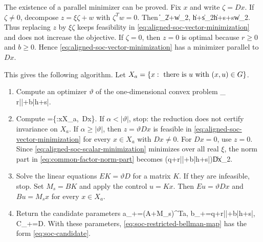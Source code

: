 \documentclass{article}
\begin{document}
The existence of a parallel minimizer can be proved. Fix $x$ and write $\zeta=Dx$. If $\zeta\neq0$, decompose $z=\xi\zeta+w$ with $\zeta^Tw=0$. Then
\BEQ
\|\xi\zeta\|_2\leq\|\xi\zeta+w\|_2,
\quad
\|h\zeta+s\xi\zeta\|_2\leq\|h\zeta+s\xi\zeta+sw\|_2.
\label{eq:aligned-soc-projection-inequality}
\EEQ
Thus replacing $z$ by $\xi\zeta$ keeps feasibility in \eqref{eq:aligned-soc-vector-minimization} and does not increase the objective. If $\zeta=0$, then $z=0$ is optimal because $r\geq0$ and $b\geq0$. Hence \eqref{eq:aligned-soc-vector-minimization} has a minimizer parallel to $Dx$.

This gives the following algorithm. Let $X_a=\{x:\hbox{ there is }u\hbox{ with }(x,u)\in G\}$.
\begin{enumerate}
\item Compute an optimizer $\vartheta$ of the one-dimensional convex problem
\BEQ
\min_{\xi\in\reals} r|\xi|+\gamma b|h+s\xi|.
\label{eq:aligned-soc-scalar-minimization}
\EEQ
\item Compute
\BEQ
\alpha=\inf\left\{:x\in X_a,\ Dx\right\}.
\label{eq:aligned-soc-state-ratio}
\EEQ
If $\alpha<|\vartheta|$, stop: the reduction does not certify invariance on $X_a$. If $\alpha\geq|\vartheta|$, then $z=\vartheta Dx$ is feasible in \eqref{eq:aligned-soc-vector-minimization} for every $x\in X_a$ with $Dx\neq0$. For $Dx=0$, use $z=0$. Since \eqref{eq:aligned-soc-scalar-minimization} minimizes over all real $\xi$, the norm part in \eqref{eq:common-factor-norm-part} becomes
\BEQ
(q+r|\vartheta|+\gamma b|h+s\vartheta|)\|Dx\|_2.
\label{eq:aligned-soc-reduced-norm}
\EEQ
\item Solve the linear equations $EK=\vartheta D$ for a matrix $K$. If they are infeasible, stop. Set $M_s=BK$ and apply the control $u=Kx$. Then $Eu=\vartheta Dx$ and $Bu=M_sx$ for every $x\in X_a$.
\item Return the candidate parameters
\BEQ
 a_+=\gamma(A+M_s)^Ta,
\quad b_+=q+r|\vartheta|+\gamma b|h+s\vartheta|,
\quad C_+=D.
\label{eq:aligned-soc-updated-parameters}
\EEQ
With these parameters, \eqref{eq:soc-restricted-bellman-map} has the form \eqref{eq:soc-candidate}.
\end{enumerate}
\end{document}
